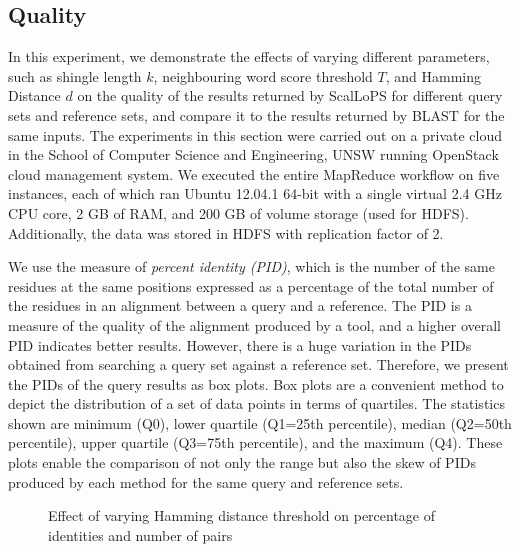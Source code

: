 \documentclass[titlepage]{csetr}
\begin{document}
\subsection{Quality}
\label{sec:quality}

In this experiment, we demonstrate the effects of varying different parameters, such as shingle length $k$, neighbouring word score threshold $T$, and Hamming Distance $d$ on the quality of the results returned by ScalLoPS for different query sets and reference sets, and compare it to the results returned by BLAST for the same inputs. The experiments in this section were carried out on a private cloud in the School of Computer Science and Engineering, UNSW running OpenStack cloud management system. We executed the entire MapReduce workflow on five instances, each of which ran Ubuntu 12.04.1 64-bit with a single virtual 2.4 GHz CPU core, 2 GB of RAM, and 200 GB of volume storage (used for HDFS). Additionally, the data was stored in HDFS with replication factor of 2.



We use the measure of \emph{percent identity (PID)}, which is the number of the same residues at the same positions expressed as a percentage of the total number of the residues in an alignment between a query and a reference. The PID is a measure of the quality of the alignment produced by a tool, and a higher overall PID indicates better results.  However, there is a huge variation in the PIDs obtained from searching a query set against a reference set. Therefore, we present the PIDs of the query results as box plots. Box plots are a convenient method to depict the distribution of a set of data points in terms of quartiles. The statistics shown are minimum (Q0), lower quartile (Q1=25th percentile), median (Q2=50th percentile), upper quartile (Q3=75th percentile), and the maximum (Q4). These plots enable the comparison of not only the range but also the skew of PIDs produced by each method for the same query and reference sets.


\begin{figure}[t]
\centering
{}
\caption{Effect of varying Hamming distance threshold on percentage of identities and number of pairs}
\label{fig:exp-quality-varHD}
\end{figure}
\end{document}
